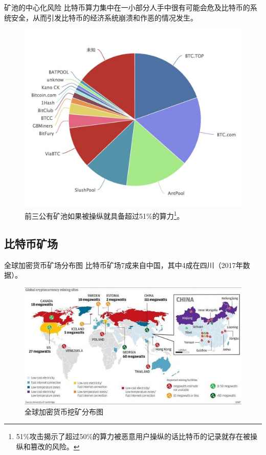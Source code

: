 \documentclass[11pt]{beamer}
\begin{document}
\begin{frame}{矿池的中心化风险}
	比特币算力集中在一小部分人手中很有可能会危及比特币的系统安全，从而引发比特币的经济系统崩溃和作恶的情况发生。
	
	\begin{figure}
		\centering
		\includegraphics[width=0.45\linewidth]{figures/poolPie}
		\caption{前三公有矿池如果被操纵就具备超过51\%的算力\footnote{51\%攻击揭示了超过50\%的算力被恶意用户操纵的话比特币的记录就存在被操纵和篡改的风险。}。}
			\label{fig:poolpie}
		\end{figure}
		
\end{frame}

\subsection{比特币矿场}

\begin{frame}{全球加密货币矿场分布图}
	比特币矿场7成来自中国，其中4成在四川（2017年数据）。
	\begin{figure}
		\centering
		\includegraphics[width=0.9\linewidth]{figures/globalCryptocurrencyMiningMap}
		\caption{全球加密货币挖矿分布图}
		\label{fig:globalcryptocurrencyminingmap}
	\end{figure}
\end{frame}
\end{document}

